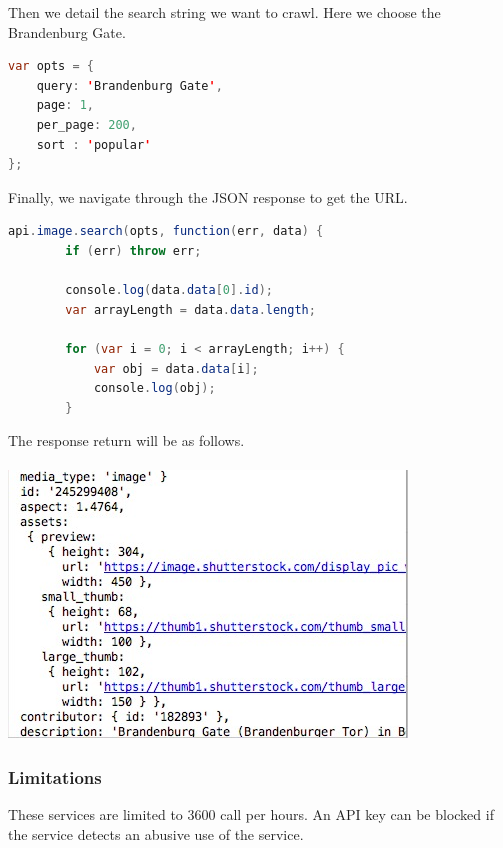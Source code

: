 Then we detail the search string we want to crawl. Here we choose the Brandenburg Gate.

\begin{lstlisting}[language=Java, basicstyle=\scriptsize]
var opts = {
    query: 'Brandenburg Gate',
    page: 1,
    per_page: 200,
    sort : 'popular'
};
\end{lstlisting}

Finally, we navigate through the JSON response to get the URL.

\begin{lstlisting}[language=Java, basicstyle=\scriptsize]
    api.image.search(opts, function(err, data) {
        if (err) throw err;

        console.log(data.data[0].id);
        var arrayLength = data.data.length;

        for (var i = 0; i < arrayLength; i++) {
            var obj = data.data[i];
            console.log(obj);
        }
\end{lstlisting}
\newpage
The response return will be as follows.\\
\\
\includegraphics{jsonShutter}

\subsubsection{Limitations}
These services are limited to 3600 call per hours. An API key can be blocked if the service detects an abusive use of the service.

